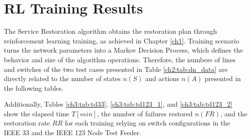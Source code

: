 \section{RL Training Results}
The Service Restoration algorithm obtains the restoration plan through reinforcement learning training, 
as achieved in Chapter \ref{ch1}. Training scenario turns the network parameters into a Markov 
Decision Process, which defines the behavior and size of the algorithm operations.
Therefore, the numbers of lines and switches of the two test cases presented in Table \ref{ch2:tab:dn_data} are 
directly related to the number of states $n(S)$ and actions $n(A)$ presented in the following tables.

Additionally, Tables \ref{ch3:tab:td33}, \ref{ch3:tab:td123_1}, and \ref{ch3:tab:td123_2} show the 
elapsed time $T[min]$, the number of failures restored $n(FR)$, and the restoration rate $RR$ for each 
training relying on switch configurations in the IEEE 33 and the IEEE 123 Node Test Feeder.




